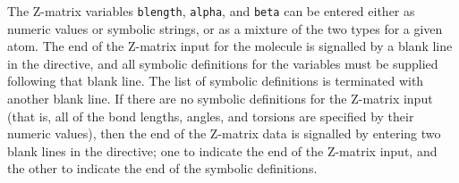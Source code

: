 \begin{enumerate}

%
%
% 
%
%
%
%
\end{enumerate}

The Z-matrix variables {\tt blength}, {\tt alpha}, and {\tt beta} can be
entered either as numeric values or symbolic strings, or as a mixture of
the two types for a given atom.   The end of the Z-matrix input for the 
molecule is signalled by a blank line in the directive, and all symbolic 
definitions for the variables must be supplied following that blank line.
The list of symbolic definitions is terminated with another blank line.
If there are no symbolic definitions for the Z-matrix input (that is,  
all of the bond lengths, angles, and torsions are specified by their 
numeric values), then the end of the Z-matrix data is signalled by entering
two blank lines in the directive; one to indicate the end of the Z-matrix 
input, and the other to indicate the end of the symbolic definitions.

